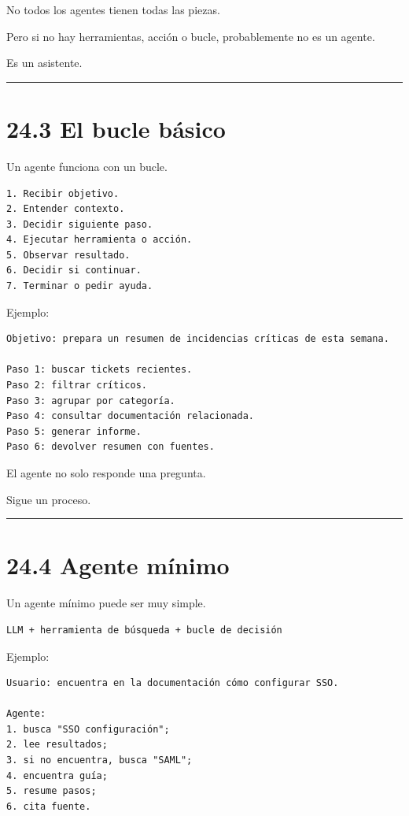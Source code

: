 No todos los agentes tienen todas las piezas.

Pero si no hay herramientas, acción o bucle, probablemente no es un
agente.

Es un asistente.

\begin{center}\rule{0.5\linewidth}{0.5pt}\end{center}

\section{24.3 El bucle básico}\label{el-bucle-buxe1sico}

Un agente funciona con un bucle.

\begin{lstlisting}
1. Recibir objetivo.
2. Entender contexto.
3. Decidir siguiente paso.
4. Ejecutar herramienta o acción.
5. Observar resultado.
6. Decidir si continuar.
7. Terminar o pedir ayuda.
\end{lstlisting}

Ejemplo:

\begin{lstlisting}
Objetivo: prepara un resumen de incidencias críticas de esta semana.

Paso 1: buscar tickets recientes.
Paso 2: filtrar críticos.
Paso 3: agrupar por categoría.
Paso 4: consultar documentación relacionada.
Paso 5: generar informe.
Paso 6: devolver resumen con fuentes.
\end{lstlisting}

El agente no solo responde una pregunta.

Sigue un proceso.

\begin{center}\rule{0.5\linewidth}{0.5pt}\end{center}

\section{24.4 Agente mínimo}\label{agente-muxednimo}

Un agente mínimo puede ser muy simple.

\begin{lstlisting}
LLM + herramienta de búsqueda + bucle de decisión
\end{lstlisting}

Ejemplo:

\begin{lstlisting}
Usuario: encuentra en la documentación cómo configurar SSO.

Agente:
1. busca "SSO configuración";
2. lee resultados;
3. si no encuentra, busca "SAML";
4. encuentra guía;
5. resume pasos;
6. cita fuente.
\end{lstlisting}

